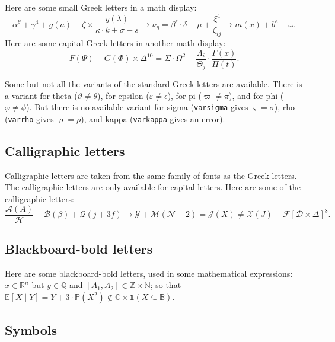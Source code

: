 \documentclass[letterpaper,11pt,leqno]{article}
\begin{document}
Here are some small Greek letters in a math display: 
\begin{equation*}
\alpha^{\theta} + \gamma^4 + g(a) - \zeta \times \frac{y(\lambda)}{\kappa \cdot k+ \sigma - s} \to \nu_{\eta} = \beta^\epsilon \cdot \delta - \mu + \frac{\xi^4}{\zeta_{ij}} \to m(x) + b^e + \omega .
\end{equation*}
Here are some capital Greek letters in another math display: 
\begin{equation}
F(\Psi) - G(\Phi) \times \Delta^{10} = \Sigma \cdot \Omega^2 - \frac{\Lambda_i}{\Theta_j} \cdot \frac{\Gamma(x)}{\Pi(t)}.
\label{e:capitalgreek}\end{equation}

Some but not all the variants of the standard Greek letters are available. There is a variant for theta ($\vartheta \neq \theta$), for epsilon ($\varepsilon \neq \epsilon$), for pi ($\varpi \neq \pi$), and for phi ($\varphi \neq \phi$). But there is no available variant for sigma (\texttt{varsigma} gives $\varsigma = \sigma$), rho (\texttt{varrho} gives $\varrho = \rho$), and kappa (\texttt{varkappa} gives an error).

\subsection{Calligraphic letters} 

Calligraphic letters are taken from the same family of fonts as the Greek letters. The calligraphic letters are only available for capital letters. Here are some of the calligraphic letters: 
\begin{equation*}
\frac{\mathcal{A}(A)}{\mathcal{H}} - \mathcal{B}(\beta) + \mathcal{Q}(j+3f) \to \mathcal{Y} + \mathcal{M}(\mathcal{N} - 2) = \mathcal{J}(X) \neq \mathcal{X}(J) - \mathcal{F}[\mathcal{D} \times \Delta]^8. 
\end{equation*}

\subsection{Blackboard-bold letters} 

Here are some blackboard-bold letters, used in some mathematical expressions: $x \in\mathbb{R}^n$ but $y\in \mathbb{Q}$ and $[A_1,A_2] \in \mathbb{Z} \times \mathbb{N}$; so that $\mathbb{E}[X\mid Y] = Y + 3 \cdot \mathbb{P}(X^2) \notin \mathbb{C} \times \mathbb{1}(X \subseteq \mathbb{B})$.

\subsection{Symbols} 
\end{document}
